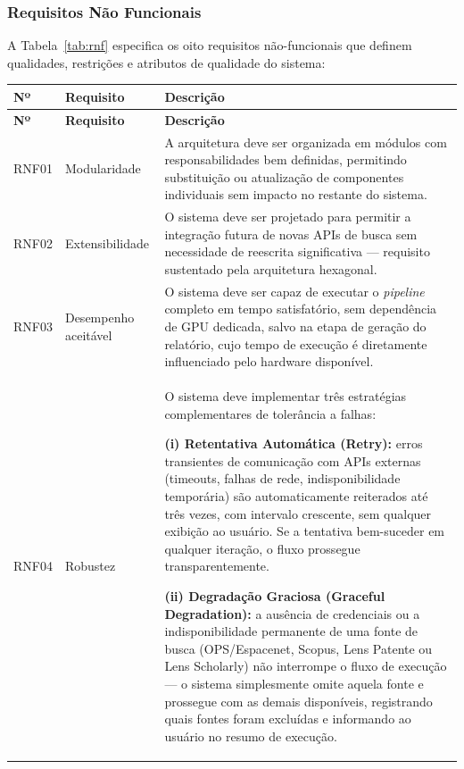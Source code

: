 \documentclass[12pt, a4paper]{article}
\begin{document}
    \subsubsection{Requisitos Não Funcionais}

  A Tabela~\ref{tab:rnf} especifica os oito requisitos não-funcionais que definem qualidades, restrições e atributos de qualidade do sistema:

\begingroup
\setlength{\tabcolsep}{10pt}
\begin{longtable}{>{\centering\arraybackslash}p{0.8cm}
                  >{\raggedright\arraybackslash}p{3.2cm}
                  >{\raggedright\arraybackslash}p{8.5cm}}
\toprule
\textbf{Nº} & \textbf{Requisito} & \textbf{Descrição} \\
\midrule
\endfirsthead
\toprule
\textbf{Nº} & \textbf{Requisito} & \textbf{Descrição} \\
\midrule
\endhead
\bottomrule
\endfoot

RNF01 & Modularidade &
A arquitetura deve ser organizada em módulos com responsabilidades bem definidas,
permitindo substituição ou atualização de componentes individuais sem impacto
no restante do sistema. \\[4pt] \addlinespace[8pt]

RNF02 & Extensibilidade &
O sistema deve ser projetado para permitir a integração futura de novas APIs
de busca sem necessidade de reescrita significativa --- requisito sustentado pela arquitetura hexagonal. \\[4pt] \addlinespace[8pt]

RNF03 & Desempenho aceitável &
O sistema deve ser capaz de executar o \textit{pipeline} completo em tempo
satisfatório, sem dependência de GPU dedicada,
salvo na etapa de geração do relatório, cujo tempo de execução é diretamente
influenciado pelo hardware disponível. \\[4pt] \addlinespace[8pt]

RNF04 & Robustez &
O sistema deve implementar três estratégias complementares de tolerância a falhas:

\hspace{0.5cm} \textbf{(i) Retentativa Automática (Retry):} erros transientes de comunicação com APIs externas (timeouts, falhas de rede, indisponibilidade temporária) são automaticamente reiterados até três vezes, com intervalo crescente, sem qualquer exibição ao usuário. Se a tentativa bem-suceder em qualquer iteração, o fluxo prossegue transparentemente.

\hspace{0.5cm} \textbf{(ii) Degradação Graciosa (Graceful Degradation):} a ausência de credenciais ou a indisponibilidade permanente de uma fonte de busca (OPS/Espacenet, Scopus, Lens Patente ou Lens Scholarly) não interrompe o fluxo de execução — o sistema simplesmente omite aquela fonte e prossegue com as demais disponíveis, registrando quais fontes foram excluídas e informando ao usuário no resumo de execução.


\end{longtable}
\end{document}
